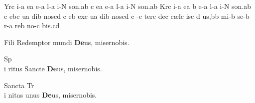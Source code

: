 
\Internote
\nosolesmescustos
\initiumgregorianum
{}%
\sgn {}Yr\punctum c\egn
\sgn {}i-\punctum a\egn
\sgn {}e{}\punctum a\egn
\spatium
\sgn {}e-\punctum a\egn
\sgn l{\e}-\punctum a\egn
\sgn {}i-\punctum N\egn
\sgn so{n.}\punctum a\augmentum b\egn
\spatium
\divisiofinalis
\spatium
{}\punctum c\egn
\sgn {}e{}\punctum a\egn
\spatium
\sgn {}e-\punctum a\egn
\sgn l{\e}-\punctum a\egn
\sgn {}i-\punctum N\egn
\sgn so{n.}\punctum a\augmentum b\egn
\spatium
\divisiofinalis
\spatium
\sgn K{\y}r\punctum c\egn
\sgn {}i-\punctum a\egn
\sgn {}e{}\punctum a\egn
\spatium
\custos b
\lineaproxima
\sgn {}e-\punctum a\egn
\sgn l{\e}-\punctum a\egn
\sgn {}i-\punctum N\egn
\sgn so{n.}\punctum a\augmentum b\egn
\spatium
\divisiofinalis
\spatium
{}\punctum c\egn
\sgn {}e{}\pes bc\egn
\spatium
{}u\punctum a\egn
\sgn di{}\punctum b\egn
\spatium
\sgn nos\punctum c\augmentum d\egn
\spatium
\divisiofinalis
\spatium
{}\punctum c\egn
\sgn {}e{}\punctum b\egn
\spatium
\sgn {}ex\punctum c\egn
\sgn {}{\a}u\punctum a\egn
\sgn di{}\punctum b\egn
\spatium
\sgn nos\punctum c\augmentum d\egn
\spatium
\divisiofinalis
\spatium
\custos c
\lineaproxima
{}-\punctum c\egn
\sgn ter\punctum c\egn
\spatium
\sgn de{}\punctum c\egn
\spatium
\sgn c{\ae}l\punctum c\egn
\sgn {}is\punctum c\egn
\spatium
{}\punctum d\egn
\sgn {}u{s,}\punctum b\augmentum b\egn
\spatium
\fissum{5pt}
\divisiomaior
\spatium
\fissum{5pt}
\sgn mi-\punctum b\egn
\sgn se-\punctum b\egn
\sgn r{\e}-\punctum a\egn
\sgn re{}\punctum b\egn
\spatium
\sgn n{o}-\punctum c\egn
\sgn bi{s.}\punctum c\augmentum d\egn
\Finisgregoriana

\smallskip


F{i}li Redemptor mundi {\bf De}us, miser\ere nobis.


Sp\\i ritus Sancte {\bf De}us, miser\ere nobis.


Sancta Tr\\i nitas unus {\bf De}us, miser\ere nobis.

